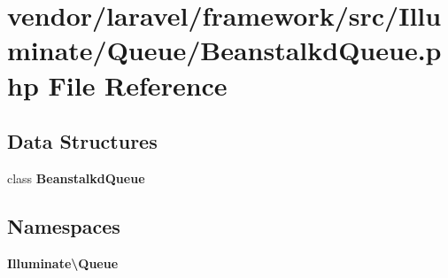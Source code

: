 \section{vendor/laravel/framework/src/\+Illuminate/\+Queue/\+Beanstalkd\+Queue.php File Reference}
\label{_beanstalkd_queue_8php}
\subsection*{Data Structures}
\begin{DoxyCompactItemize}
\item 
class {\bf Beanstalkd\+Queue}
\end{DoxyCompactItemize}
\subsection*{Namespaces}
\begin{DoxyCompactItemize}
\item 
 {\bf Illuminate\textbackslash{}\+Queue}
\end{DoxyCompactItemize}
